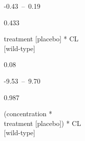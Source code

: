 \documentclass[
  letterpaper,
  DIV=11,
  numbers=noendperiod]{scrartcl}
\begin{document}
\begin{table}
\begin{minipage}[t]{\linewidth}
{\centering 

-0.43~--~0.19

}

\end{minipage}%
\newline
\begin{minipage}[t]{\linewidth}

{\centering 

0.433

}

\end{minipage}%
\newline
\begin{minipage}[t]{\linewidth}

{\centering 

treatment {[}placebo{]} * CL\\
{[}wild-type{]}

}

\end{minipage}%
\newline
\begin{minipage}[t]{\linewidth}

{\centering 

0.08

}

\end{minipage}%
\newline
\begin{minipage}[t]{\linewidth}

{\centering 

-9.53~--~9.70

}

\end{minipage}%
\newline
\begin{minipage}[t]{\linewidth}

{\centering 

0.987

}

\end{minipage}%
\newline
\begin{minipage}[t]{\linewidth}

{\centering 

(concentration *\\
treatment {[}placebo{]}) * CL\\
{[}wild-type{]}

}

\end{minipage}%
\newline
\begin{minipage}[t]{\linewidth}


\end{minipage}
\end{table}
\end{document}
